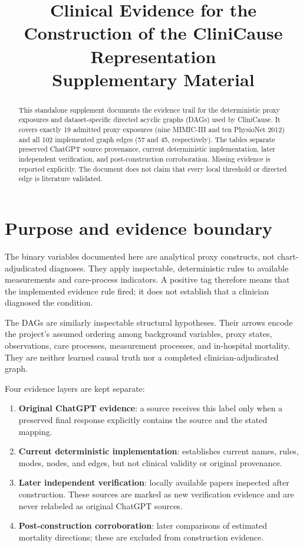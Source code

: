 \documentclass[10pt]{article}
\title{\textbf{Clinical Evidence for the Construction of the CliniCause Representation}\\[4pt]
\large Supplementary Material}
\author{}
\date{}
\begin{document}
\maketitle

\begin{abstract}
This standalone supplement documents the evidence trail for the deterministic proxy
exposures and dataset-specific directed acyclic graphs (DAGs) used by CliniCause.
It covers exactly 19 admitted proxy exposures (nine MIMIC-III and ten PhysioNet
2012) and all 102 implemented graph edges (57 and 45, respectively). The tables
separate preserved ChatGPT source provenance, current deterministic implementation,
later independent verification, and post-construction corroboration. Missing evidence
is reported explicitly. The document does not claim that every local threshold or
directed edge is literature validated.
\end{abstract}

\section{Purpose and evidence boundary}

The binary variables documented here are analytical proxy constructs, not
chart-adjudicated diagnoses. They apply inspectable, deterministic rules to available
measurements and care-process indicators. A positive tag therefore means that the
implemented evidence rule fired; it does not establish that a clinician diagnosed the
condition.

The DAGs are similarly inspectable structural hypotheses. Their arrows encode the
project's assumed ordering among background variables, proxy states, observations,
care processes, measurement processes, and in-hospital mortality. They are neither
learned causal truth nor a completed clinician-adjudicated graph.

Four evidence layers are kept separate:
\begin{enumerate}
  \item \textbf{Original ChatGPT evidence}: a source receives this label only when a
  preserved final response explicitly contains the source and the stated mapping.
  \item \textbf{Current deterministic implementation}: establishes current names,
  rules, modes, nodes, and edges, but not clinical validity or original provenance.
  \item \textbf{Later independent verification}: locally available papers inspected
  after construction. These sources are marked as new verification evidence and are
  never relabeled as original ChatGPT sources.
  \item \textbf{Post-construction corroboration}: later comparisons of estimated
  mortality directions; these are excluded from construction evidence.
\end{enumerate}
\end{document}
